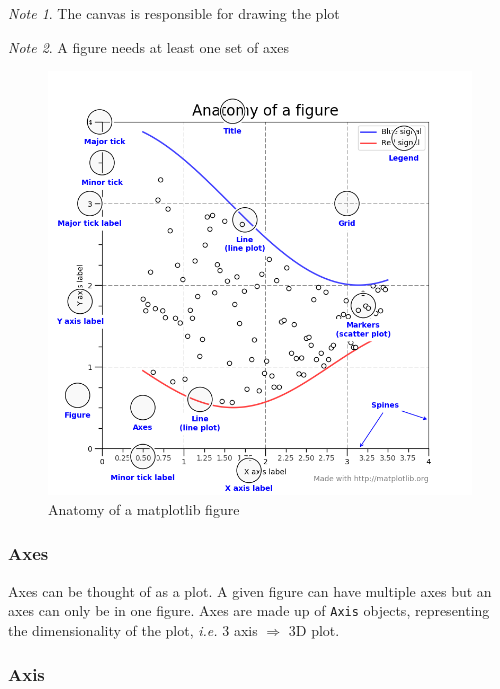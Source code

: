 \documentclass{article}
\theoremstyle{definition}
\theoremstyle{remark}
\newtheorem*{nb}{Note}
\begin{document}
\begin{nb}
The canvas is responsible for drawing the plot
\end{nb}

\begin{nb}
    A figure needs at least one set of axes
\end{nb}

\begin{figure}[h!]
    \centering
    \includegraphics[width=\textwidth]{matplotlib_figure_anatomy}
    \caption{Anatomy of a matplotlib figure}
    \label{fig:mesh1}
\end{figure}

\clearpage

\subsubsection{Axes}

Axes can be thought of as a plot. A given figure can have multiple axes but an axes can only be in one figure. Axes are made up of \lstinline{Axis} objects, representing the dimensionality of the plot, \textit{i.e.} 3 axis $ \Rightarrow $ 3D plot.


\subsubsection{Axis}
\end{document}
